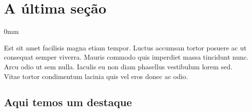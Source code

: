 \documentclass[./main.tex]{subfiles}
\begin{document}
\section{A última seção} \label{chp2:sec3}

\begin{adjustwidth}{\bodytab}{0mm}

\par Est sit amet facilisis magna etiam tempor. Luctus accumsan tortor posuere ac ut consequat semper viverra. Mauris commodo quis imperdiet massa tincidunt nunc. Arcu odio ut sem nulla. Iaculis eu non diam phasellus vestibulum lorem sed. Vitae tortor condimentum lacinia quis vel eros donec ac odio.

\blindtext[2]

\subsection{Aqui temos um destaque} \label{chp2:sec3:sub1}

\blindtext[2]


\end{adjustwidth}
\end{document}

